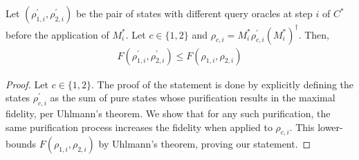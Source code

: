 \begin{lemma}\label{lemma_fidelity_partial_measurement}
    Let $(\rho^\prime_{1, i}, \rho^\prime_{2, i})$ be the pair of states with different query oracles at step $i$ of $C^*$ before the application of $M^*_i$. Let $c\in \{1,2\}$ and $\rho_{c, i} = M^*_i \rho^\prime_{c, i} (M^*_i)^\dagger$. Then,
    \begin{align*}
        F(\rho^\prime_{1, i}, \rho^\prime_{2, i}) \leq F(\rho_{1,i}, \rho_{2, i})
    \end{align*}
\end{lemma}
\begin{proof}
    Let $c\in \{1,2\}$. The proof of the statement is done by explicitly defining the states $\rho^\prime_{c, i}$ as the sum of pure states whose purification results in the maximal fidelity, per Uhlmann's theorem. We show that for any such purification, the same purification process increases the fidelity when applied to $\rho_{c, i}$. This lower-bounds $F(\rho_{1,i}, \rho_{2, i})$ by Uhlmann's theorem, proving our statement.


\end{proof}
